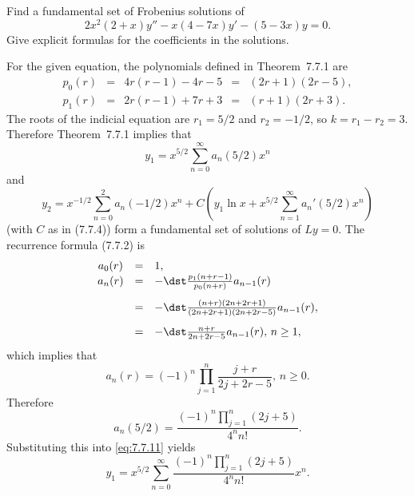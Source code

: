 \setcounter{example}{0}
\begin{example}
  \label{example:7.7.1} \rm Find a fundamental set of Frobenius solutions of
  \[
    2x^{2}(2+x)y''-x(4-7x)y'-(5-3x)y=0.
  \]
  Give explicit formulas for the coefficients in the solutions.
\end{example}
\setcounter{equation}{10}
\begin{examplesolution}
\solution For the given equation, the polynomials defined in Theorem~7.7.1 are
\[
  \begin{array}{ccccc}
    p_{0}(r) & = & 4r(r-1)-4r-5 & = & (2r+1)(2r-5), \\[5pt]
    p_{1}(r) & = & 2r(r-1)+7r+3 & = & (r+1)(2r+3).
  \end{array}
\]
The roots of the indicial equation are $r_{1}=5/2$ and $r_{2}=-1/2$, so $k=r_{1}-r_{2}=3$. Therefore
Theorem~7.7.1 implies that
\begin{equation}
  \label{eq:7.7.11}y_{1}=x^{5/2}\sum_{n=0}^{\infty}a_{n}(5/2)x^{n}
\end{equation}
and
\begin{equation}
  \label{eq:7.7.12}y_{2}=x^{-1/2}\sum_{n=0}^{2}a_{n}(-1/2)x^{n}+C\left(y_{1}\ln x+x^{5/2}\sum_{n=1}^{\infty}a_{n}'(5/2)x^{n}\right)
\end{equation}
(with $C$ as in \textup{(7.7.4)}) form a fundamental set of solutions of $Ly=0$. The recurrence
formula \textup{(7.7.2)} is
\begin{equation}
  \label{eq:7.7.13}
  \begin{array}{ccl}
    a_{0}(r) & = & 1,                                                        \\
    a_{n}(r) & = & -\dst\frac{p_{1}(n+r-1)}{p_{0}(n+r)}a_{n-1}(r)            \\[10pt]
             & = & -\dst\frac{(n+r)(2n+2r+1)}{(2n+2r+1)(2n+2r-5)}a_{n-1}(r), \\[10pt]
             & = & -\dst\frac{n+r}{2n+2r-5}a_{n-1}(r),\,n\ge1,
  \end{array}
\end{equation}
which implies that
\begin{equation}
  \label{eq:7.7.14}a_{n}(r)=(-1)^{n}\prod_{j=1}^{n}\frac{j+r}{2j+2r-5},\,n\ge0.
\end{equation}
Therefore
\begin{equation}
  \label{eq:7.7.15}a_{n}(5/2)=\frac{(-1)^{n}\prod_{j=1}^{n}(2j+5)}{4^{n}n!}.
\end{equation}
Substituting this into \eqref{eq:7.7.11} yields
\[
  y_{1}=x^{5/2}\sum_{n=0}^{\infty}\frac{(-1)^{n}\prod_{j=1}^{n}(2j+5)}{4^{n}n!}x^{n}.
\]


\end{examplesolution}
